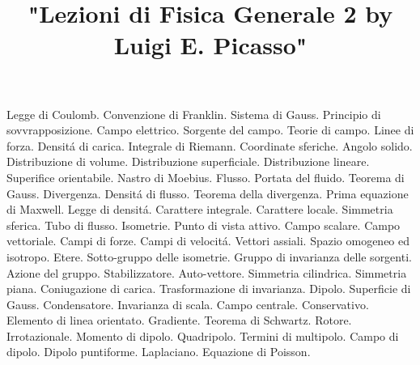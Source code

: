 

\usepackage[italian]{babel}

\title{"Lezioni di Fisica Generale 2 by Luigi E. Picasso"}


\maketitle

\begin{multicols}{3}
  Legge di Coulomb. Convenzione di Franklin. Sistema di Gauss. Principio di sovvrapposizione.
  Campo elettrico. Sorgente del campo. Teorie di campo. Linee di forza. Densit\'a di carica.
  Integrale di Riemann. Coordinate sferiche. Angolo solido. Distribuzione di volume.
  Distribuzione superficiale. Distribuzione lineare. Superifice orientabile. Nastro di Moebius. Flusso.
  Portata del fluido. Teorema di Gauss. Divergenza. Densit\'a di flusso. Teorema della divergenza.
  Prima equazione di Maxwell. Legge di densit\'a. Carattere integrale. Carattere locale. Simmetria sferica.
  Tubo di flusso. Isometrie. Punto di vista attivo. Campo scalare. Campo vettoriale. Campi di forze.
  Campi di velocit\'a. Vettori assiali. Spazio omogeneo ed isotropo. Etere. Sotto-gruppo delle isometrie.
  Gruppo di invarianza delle sorgenti. Azione del gruppo. Stabilizzatore. Auto-vettore. Simmetria cilindrica.
  Simmetria piana. Coniugazione di carica. Trasformazione di invarianza. Dipolo. Superficie di Gauss. Condensatore.
  Invarianza di scala. Campo centrale. Conservativo. Elemento di linea orientato. Gradiente. Teorema di Schwartz. Rotore.
  Irrotazionale. Momento di dipolo. Quadripolo. Termini di multipolo. Campo di dipolo. Dipolo puntiforme. Laplaciano. Equazione di Poisson.
\end{multicols}

